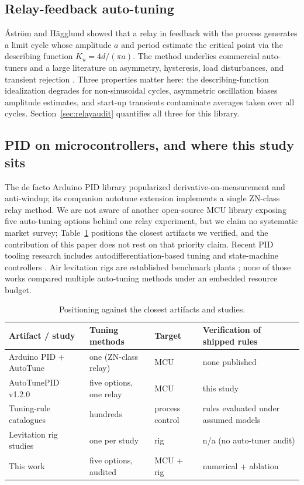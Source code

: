 \documentclass[10pt,twocolumn]{article}
\begin{document}
\subsection{Relay-feedback auto-tuning}

Åström and Hägglund \cite{astrom1984} showed that a relay in feedback with the process generates a limit cycle whose amplitude $a$ and period estimate the critical point via the describing function $K_u = 4d/(\pi a)$. The method underlies commercial auto-tuners and a large literature on asymmetry, hysteresis, load disturbances, and transient rejection \cite{astrom1988book, hang1993}. Three properties matter here: the describing-function idealization degrades for non-sinusoidal cycles, asymmetric oscillation biases amplitude estimates, and start-up transients contaminate averages taken over all cycles. Section~\ref{sec:relayaudit} quantifies all three for this library.

\subsection{PID on microcontrollers, and where this study sits}

The de facto Arduino PID library \cite{beauregard2011} popularized derivative-on-measurement and anti-windup; its companion autotune extension implements a single ZN-class relay method. We are not aware of another open-source MCU library exposing five auto-tuning options behind one relay experiment, but we claim no systematic market survey; Table~\ref{tab:related} positions the closest artifacts we verified, and the contribution of this paper does not rest on that priority claim. Recent PID tooling research includes autodifferentiation-based tuning \cite{kumar2021} and state-machine controllers \cite{thapa2026}. Air levitation rigs are established benchmark plants \cite{jernigan2009, tkacik2021, zachi2025}; none of those works compared multiple auto-tuning methods under an embedded resource budget.

\begin{table}[t]
\centering
\caption{Positioning against the closest artifacts and studies.}
\label{tab:related}
\scriptsize
\setlength{\tabcolsep}{3pt}
\begin{tabular}{@{}p{2.0cm}p{2.2cm}p{1.1cm}p{2.0cm}@{}}
\toprule
Artifact / study & Tuning methods & Target & Verification of shipped rules \\
\midrule
Arduino PID + AutoTune \cite{beauregard2011} & one (ZN-class relay) & MCU & none published \\
AutoTunePID v1.2.0 \cite{autotunepid} & five options, one relay & MCU & this study \\
Tuning-rule catalogues \cite{odwyer2006, skogestad2003} & hundreds & process control & rules evaluated under assumed models \\
Levitation rig studies \cite{jernigan2009, tkacik2021, zachi2025} & one per study & rig & n/a (no auto-tuner audit) \\
This work & five options, audited & MCU + rig & numerical + ablation \\
\bottomrule
\end{tabular}
\end{table}
\end{document}
